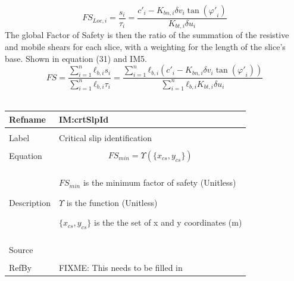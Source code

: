 \documentclass[12pt]{article}
\begin{document}
\begin{dmath}
{FS_{Loc,i}}=\frac{s_{i}}{τ_{i}}=\frac{{c'}_{i}-{K_{bn,i}} {δv}_{i} \tan\left({φ'}_{i}\right)}{{K_{bt,i}} {δu}_{i}}
\end{dmath}
The global Factor of Safety is then the ratio of the summation of the resistive and mobile shears for each slice, with a weighting for the length of the slice's base. Shown in equation (31) and IM5.
\begin{dmath}
FS=\frac{\displaystyle\sum_{i=1}^{n}{{ℓ_{b,i}} s_{i}}}{\displaystyle\sum_{i=1}^{n}{{ℓ_{b,i}} τ_{i}}}=\frac{\displaystyle\sum_{i=1}^{n}{{ℓ_{b,i}} \left({c'}_{i}-{K_{bn,i}} {δv}_{i} \tan\left({φ'}_{i}\right)\right)}}{\displaystyle\sum_{i=1}^{n}{{ℓ_{b,i}} {K_{bt,i}} {δu}_{i}}}
\end{dmath}
~\newline
\noindent \begin{minipage}{\textwidth}
\begin{tabular}{p{} p{}}
\toprule \textbf{Refname} & \textbf{IM:crtSlpId}
\label{IM:crtSlpId}
\\ \midrule \\
Label & Critical slip identification
\\ \midrule \\
Equation & \begin{dmath}
           {FS_{min}}=Υ\left(\{{x_{cs}}{,y_{cs}}\}\right)
           \end{dmath}
\\ \midrule \\
Description & \begin{symbDescription}
              \item{${FS_{min}}$ is the minimum factor of safety (Unitless)}
              \item{$Υ$ is the function (Unitless)}
              \item{$\{{x_{cs}}{,y_{cs}}\}$ is the the set of x and y coordinates (m)}
              \end{symbDescription}
\\ \midrule \\
Source &
\\ \midrule \\
RefBy & FIXME: This needs to be filled in
\\ \bottomrule \end{tabular}
\end{minipage}\\
\end{document}
